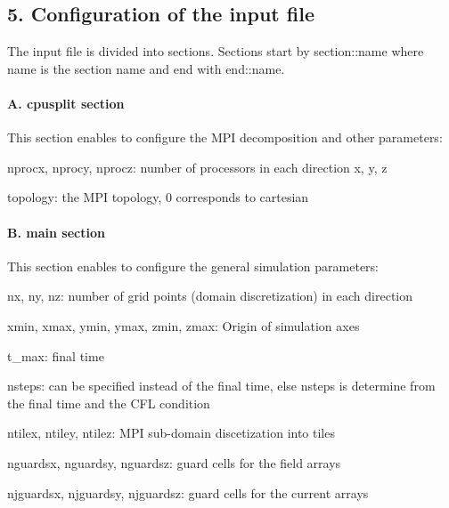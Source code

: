 \subsection*{5. Configuration of the input file }

The input file is divided into sections. Sections start by {\ttfamily section\+::name} where {\ttfamily name} is the section name and end with {\ttfamily end\+::name}.

\paragraph*{A. cpusplit section}

This section enables to configure the M\+PI decomposition and other parameters\+:


\begin{DoxyItemize}
\item {\ttfamily nprocx}, {\ttfamily nprocy}, {\ttfamily nprocz}\+: number of processors in each direction x, y, z
\item {\ttfamily topology}\+: the M\+PI topology, 0 corresponds to cartesian
\end{DoxyItemize}

\paragraph*{B. main section}

This section enables to configure the general simulation parameters\+:


\begin{DoxyItemize}
\item {\ttfamily nx}, {\ttfamily ny}, {\ttfamily nz}\+: number of grid points (domain discretization) in each direction
\item {\ttfamily xmin}, {\ttfamily xmax}, {\ttfamily ymin}, {\ttfamily ymax}, {\ttfamily zmin}, {\ttfamily zmax}\+: Origin of simulation axes
\item {\ttfamily t\+\_\+max}\+: final time
\item {\ttfamily nsteps}\+: can be specified instead of the final time, else nsteps is determine from the final time and the C\+FL condition
\item {\ttfamily ntilex}, {\ttfamily ntiley}, {\ttfamily ntilez}\+: M\+PI sub-\/domain discetization into tiles
\item {\ttfamily nguardsx}, {\ttfamily nguardsy}, {\ttfamily nguardsz}\+: guard cells for the field arrays
\item {\ttfamily njguardsx}, {\ttfamily njguardsy}, {\ttfamily njguardsz}\+: guard cells for the current arrays
\end{DoxyItemize}

